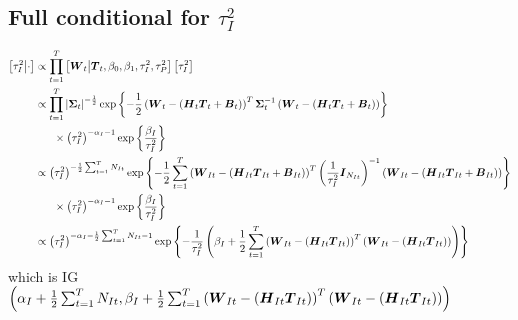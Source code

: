 \documentclass{article}\usepackage[]{graphicx}\usepackage[]{color}
\def\bm#1{\mbox{\boldmath $#1$}}
\begin{document}
\subsection{Full conditional for $\tau^2_I$}
%
\begin{align*}
%
\left[ \tau^2_I \middle| \cdot \right] & \propto \prod_{t = 1}^T \left[ \bm{W}_t \middle| \bm{T}_t, \beta_0, \beta_1, \tau^2_I, \tau^2_P \right] \left[ \tau^2_I \right] \\
%
& \propto \prod_{t = 1}^T \left| \bm{\Sigma}_t \right|^{ - \frac{1} {2}} \exp{ \left\{ - \frac{1} {2} \left( \bm{W}_t - \left( \bm{H}_t \bm{T}_t + \bm{B}_t \right) \right)^T \bm{\Sigma}_t^{ - 1} \left( \bm{W}_t - \left( \bm{H}_t \bm{T}_t + \bm{B}_t \right) \right) \right\} }\\
& \hspace{6mm} \times \left( \tau^2_I \right)^{ - \alpha_I - 1 } \exp{ \left\{ \frac{\beta_I} {\tau^2_I} \right\} }\\
%
& \propto \left( \tau^2_I \right)^{ - \frac{1} {2} \sum_{t = 1}^T N_{It}} \exp{ \left\{ - \frac{1} {2} \sum_{t = 1}^T \left( \bm{W}_{It} - \left( \bm{H}_{It} \bm{T}_{It} + \bm{B}_{It} \right) \right)^T \left( \frac{1} {\tau^2_I} \bm{I}_{N_{It}} \right)^{ - 1} \left( \bm{W}_{It} - \left( \bm{H}_{It} \bm{T}_{It} + \bm{B}_{It} \right) \right) \right\} }\\
& \hspace{6mm} \times \left( \tau^2_I \right)^{ - \alpha_I - 1 } \exp{ \left\{ \frac{\beta_I} {\tau^2_I} \right\} }\\
%
& \propto \left( \tau^2_I \right)^{ - \alpha_I - \frac{1} {2} \sum_{t = 1}^T N_{It} - 1 } \exp{ \left\{ - \frac{1} {\tau^2_I} \left( \beta_I + \frac{1} {2} \sum_{t = 1}^T \left( \bm{W}_{It} - \left( \bm{H}_{It} \bm{T}_{It} \right) \right)^T \left( \bm{W}_{It} - \left( \bm{H}_{It} \bm{T}_{It} \right) \right) \right) \right\} }\\
%
\end{align*}
%
which is IG$\left( \alpha_I + \frac{1} {2} \sum_{t = 1}^T N_{It}, \beta_I + \frac{1} {2} \sum_{t = 1}^T \left( \bm{W}_{It} - \left( \bm{H}_{It} \bm{T}_{It} \right) \right)^T \left( \bm{W}_{It} - \left( \bm{H}_{It} \bm{T}_{It} \right) \right) \right)$
%
%
\end{document}
